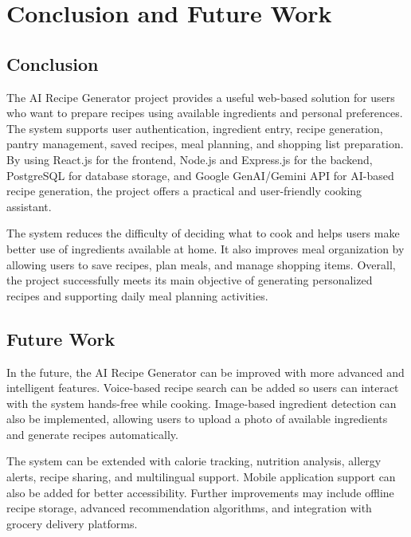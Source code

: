 \section{Conclusion and Future Work}

\subsection{Conclusion}

The AI Recipe Generator project provides a useful web-based solution for users who want to prepare recipes using available ingredients and personal preferences. The system supports user authentication, ingredient entry, recipe generation, pantry management, saved recipes, meal planning, and shopping list preparation. By using React.js for the frontend, Node.js and Express.js for the backend, PostgreSQL for database storage, and Google GenAI/Gemini API for AI-based recipe generation, the project offers a practical and user-friendly cooking assistant.

The system reduces the difficulty of deciding what to cook and helps users make better use of ingredients available at home. It also improves meal organization by allowing users to save recipes, plan meals, and manage shopping items. Overall, the project successfully meets its main objective of generating personalized recipes and supporting daily meal planning activities.

\subsection{Future Work}

In the future, the AI Recipe Generator can be improved with more advanced and intelligent features. Voice-based recipe search can be added so users can interact with the system hands-free while cooking. Image-based ingredient detection can also be implemented, allowing users to upload a photo of available ingredients and generate recipes automatically.

The system can be extended with calorie tracking, nutrition analysis, allergy alerts, recipe sharing, and multilingual support. Mobile application support can also be added for better accessibility. Further improvements may include offline recipe storage, advanced recommendation algorithms, and integration with grocery delivery platforms.
